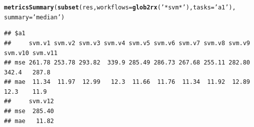 \documentclass[10pt,a4paper]{article}\usepackage[]{graphicx}\usepackage[]{color}
\makeatletter
\newcommand{\hlstr}[1]{\textcolor[rgb]{0.192,0.494,0.8}{#1}}%
\newcommand{\hlstd}[1]{\textcolor[rgb]{0.345,0.345,0.345}{#1}}%
\newcommand{\hlkwc}[1]{\textcolor[rgb]{0.333,0.667,0.333}{#1}}%
\newcommand{\hlkwd}[1]{\textcolor[rgb]{0.737,0.353,0.396}{\textbf{#1}}}%
\newenvironment{kframe}{%
 \def\at@end@of@kframe{}%
 \ifinner\ifhmode%
  \def\at@end@of@kframe{\end{minipage}}%
  \begin{minipage}{\columnwidth}%
 \fi\fi%
 \def\FrameCommand##1{\hskip\@totalleftmargin \hskip-\fboxsep
 \colorbox{shadecolor}{##1}\hskip-\fboxsep
     \hskip-\linewidth \hskip-\@totalleftmargin \hskip\columnwidth}%
 \MakeFramed {\advance\hsize-\width
   \@totalleftmargin\z@ \linewidth\hsize
   \@setminipage}}%
 {\par\unskip\endMakeFramed%
 \at@end@of@kframe}
\newenvironment{knitrout}{}{} %
\makeatother
\begin{document}
\begin{knitrout}\small
{}\color{fgcolor}\begin{kframe}
\begin{alltt}
\hlkwd{metricsSummary}\hlstd{(}\hlkwd{subset}\hlstd{(res,}\hlkwc{workflows}\hlstd{=}\hlkwd{glob2rx}\hlstd{(}\hlstr{'*svm*'}\hlstd{),}\hlkwc{tasks}\hlstd{=}\hlstr{'a1'}\hlstd{),}
               \hlkwc{summary}\hlstd{=}\hlstr{'median'}\hlstd{)}
\end{alltt}
\begin{verbatim}
## $a1
##     svm.v1 svm.v2 svm.v3 svm.v4 svm.v5 svm.v6 svm.v7 svm.v8 svm.v9 svm.v10 svm.v11
## mse 261.78 253.78 293.82  339.9 285.49 286.73 267.68 255.11 282.80   342.4   287.8
## mae  11.34  11.97  12.99   12.3  11.66  11.76  11.34  11.92  12.89    12.3    11.9
##     svm.v12
## mse  285.40
## mae   11.82
\end{verbatim}
\end{kframe}
\end{knitrout}




\end{document}
